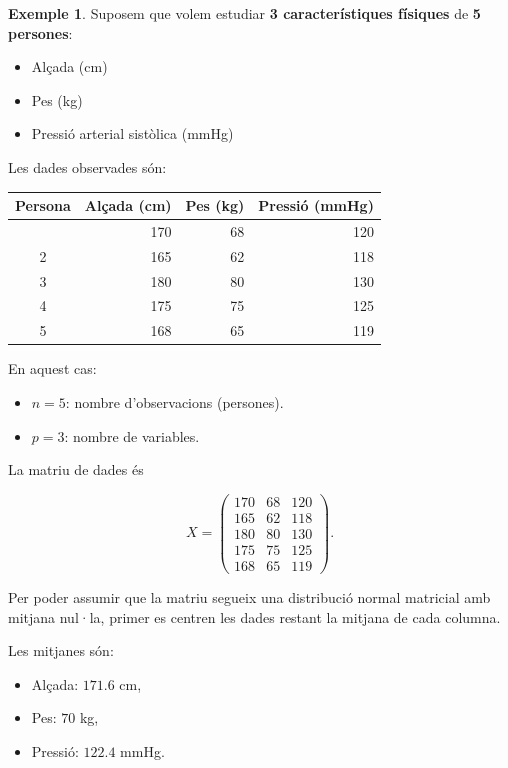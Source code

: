 \documentclass[
  catalan,
]{article}
\newcounter{none} %
\providecommand{\tightlist}{%
  \setlength{\itemsep}{0pt}\setlength{\parskip}{0pt}}
\theoremstyle{definition}
\theoremstyle{definition}
\newtheorem{example}{Exemple}[section]
\theoremstyle{definition}
\theoremstyle{definition}
\theoremstyle{remark}
\begin{document}
\begin{example}
Suposem que volem estudiar \textbf{3 característiques físiques} de \textbf{5 persones}:

\begin{itemize}
\tightlist
\item
  Alçada (cm)
\item
  Pes (kg)
\item
  Pressió arterial sistòlica (mmHg)
\end{itemize}

Les dades observades són:

{\def\LTcaptype{none} %
\begin{longtable}[]{@{}crrr@{}}
\toprule\noalign{}
Persona & Alçada (cm) & Pes (kg) & Pressió (mmHg) \\
\midrule\noalign{}
\endhead
\bottomrule\noalign{}
\endlastfoot
1 & 170 & 68 & 120 \\
2 & 165 & 62 & 118 \\
3 & 180 & 80 & 130 \\
4 & 175 & 75 & 125 \\
5 & 168 & 65 & 119 \\
\end{longtable}
}

En aquest cas:

\begin{itemize}
\tightlist
\item
  \(n = 5\): nombre d'observacions (persones).
\item
  \(p = 3\): nombre de variables.
\end{itemize}

La matriu de dades és

\[
X=
\begin{pmatrix}
170 & 68 & 120\\
165 & 62 & 118\\
180 & 80 & 130\\
175 & 75 & 125\\
168 & 65 & 119
\end{pmatrix}.
\]

Per poder assumir que la matriu segueix una distribució normal matricial amb mitjana nul·la, primer es centren les dades restant la mitjana de cada columna.

Les mitjanes són:

\begin{itemize}
\tightlist
\item
  Alçada: \(171.6\) cm,
\item
  Pes: \(70\) kg,
\item
  Pressió: \(122.4\) mmHg.
\end{itemize}


\end{example}
\end{document}
